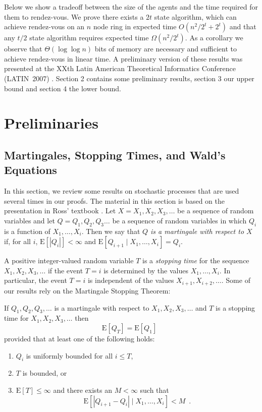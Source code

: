 \documentclass[lotsofwhite]{patmorin}
\newcommand{\E}{\mathrm{E}}
\begin{document}
Below we show a tradeoff between the size of the agents and the time
required for them to rendez-vous. We prove there exists a $2t$ state
algorithm,   which can achieve rendez-vous on an $n$ node ring in
expected time $O(n^2/2^{t} + 2^{t} )$ and that any $t/2$ state
algorithm requires expected time $\Omega( n^2/2^t )$.  As a corollary
we observe that $\Theta(\log \log n)$ bits of memory are necessary and
sufficient to achieve rendez-vous in linear time.  A preliminary
version of these results was presented at the XXth Latin American
Theoretical Informatics Conference (LATIN~2007) \cite{latin}. Section
2 contains some preliminary results, section 3 our upper bound and
section 4 the lower bound.   


\section{Preliminaries}

\subsection{Martingales, Stopping Times, and Wald's Equations}

In this section, we review some results on stochastic processes that
are used several times in our proofs.  The material in this section is
based on the presentation in Ross' textbook \cite[Chapter 6]{ross}.
Let $X=X_1,X_2,X_3,\ldots$ be a sequence of random variables and let
$Q=Q_1,Q_2,Q_3\ldots$ be a sequence of random variables in which $Q_i$
is a function of $X_1,\ldots,X_i$.  Then we say that \emph{$Q$ is a
martingale with respect to $X$} if, for all $i$, $\E[|Q_i|] < \infty$
and $\E[Q_{i+1}\mid X_1,\ldots,X_i] = Q_i$.

A positive integer-valued random variable $T$ is a \emph{stopping
time} for the sequence $X_1,X_2,X_3,\ldots$ if the event $T=i$ is
determined by the values $X_1,\ldots,X_i$.  In particular, the event
$T=i$ is independent of the values $X_{i+1},X_{i+2},\ldots$.  Some of
our results rely on the Martingale Stopping Theorem:

\begin{thm}
If $Q_1,Q_2,Q_3,\ldots$ is a martingale with respect to
$X_1,X_2,X_3,\ldots$ and $T$ is a stopping time for
$X_1,X_2,X_3,\ldots$ then
\[
   \E[Q_T] = \E[Q_1] \enspace 
\]
provided that at least one of the following holds:
\begin{enumerate}
\item $Q_i$ is uniformly bounded for all $i\le T$,
\item $T$ is bounded, or
\item $\E[T]\le \infty$ and there exists an $M<\infty$ such that
\[ \E\left[|Q_{i+1}-Q_i| \mid X_1,\ldots,X_i \right] < M  \enspace . \]
\end{enumerate}
\end{thm}
\end{document}
